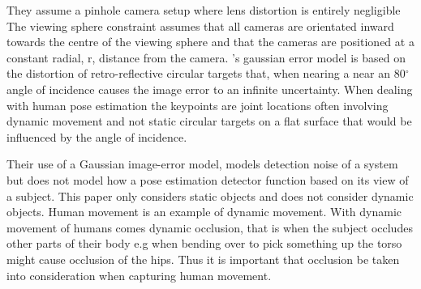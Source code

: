They assume a pinhole camera setup where lens distortion is entirely negligible
The viewing sphere constraint assumes that all cameras are orientated inward towards the centre of the viewing sphere and that the cameras are positioned at a constant radial, r, distance from the camera.
\citet{olague2002optimal}'s gaussian error model is based on the distortion of retro-reflective circular targets that, when nearing a near an 80$^{\circ}$ angle of incidence causes the image error to an infinite uncertainty. When dealing with human pose estimation the keypoints are joint locations often involving dynamic movement and not static circular targets on a flat surface that would be influenced by the angle of incidence.



Their use of a Gaussian image-error model, models detection noise of a system but does not model how a pose estimation detector function based on its view of a subject.
This paper only considers static objects and does not consider dynamic objects. Human movement is an example of dynamic movement. With dynamic movement of humans comes dynamic occlusion, that is when the subject occludes other parts of their body e.g when bending over to pick something up the torso might cause occlusion of the hips.
Thus it is important that occlusion be taken into consideration when capturing human movement.

